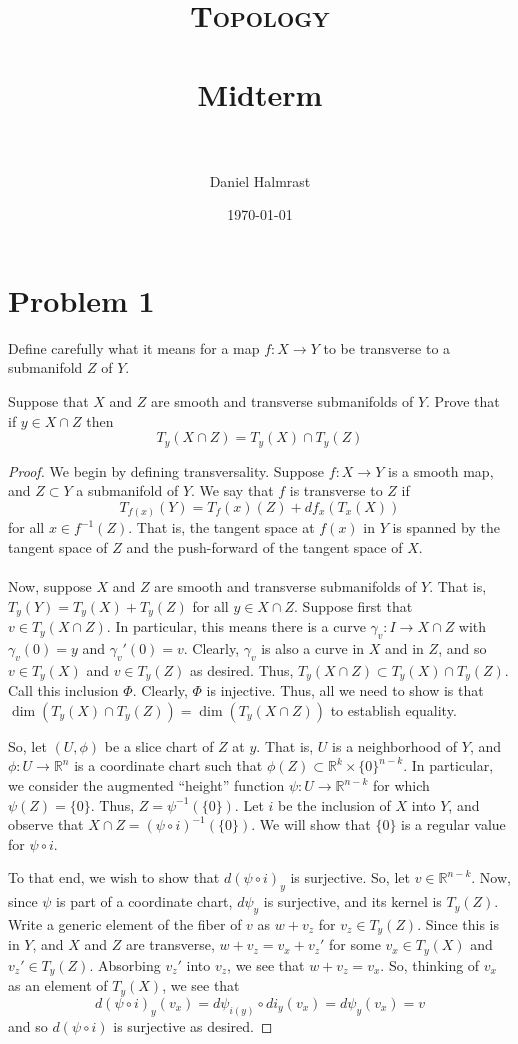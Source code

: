 \documentclass[fontsize=11pt]{scrartcl} %
\title{	
\normalfont \normalsize 
\textsc{Topology} \\ [25pt] %
\horrule{0.5pt} \\[0.4cm] %
\huge Midterm \\ %
\horrule{2pt} \\[0.5cm] %
}
\author{Daniel Halmrast} %
\date{\normalsize\today} %
\numberwithin{equation}{section} %
\numberwithin{figure}{section} %
\numberwithin{table}{section} %
\newcommand{\R}{\mathbb{R}}
\begin{document}
\maketitle %

\section*{Problem 1}
Define carefully what it means for a map $f:X\to Y$ to be transverse to a
submanifold $Z$ of $Y$.

Suppose that $X$ and $Z$ are smooth and transverse submanifolds of $Y$. Prove
that if $y\in X\cap Z$ then
\[
    T_y(X\cap Z) = T_y(X)\cap T_y(Z)
\]

\begin{proof}
    We begin by defining transversality. Suppose $f:X\to Y$ is a smooth map, and
    $Z\subset Y$ a submanifold of $Y$. We say that $f$ is transverse to $Z$ if
    \[
        T_{f(x)}(Y) = T_f(x)(Z) + df_x(T_x(X))
    \]
    for all $x\in f^{-1}(Z)$. That is, the tangent space at $f(x)$ in $Y$ is
    spanned by the tangent space of $Z$ and the push-forward of the tangent
    space of $X$.
    \\
    \\
    Now, suppose $X$ and $Z$ are smooth and transverse submanifolds of $Y$. That
    is, $T_y(Y) = T_y(X)+T_y(Z)$ for all $y\in X\cap Z$. Suppose first that
    $v\in T_y(X\cap Z)$. In particular, this means there is a curve
    $\gamma_v:I\to X\cap Z$ with $\gamma_v(0)=y$ and $\gamma_v'(0)=v$. Clearly,
    $\gamma_v$ is also a curve in $X$ and in $Z$, and so $v\in T_y(X)$ and $v\in
    T_y(Z)$ as desired. Thus, $T_y(X\cap Z)\subset T_y(X)\cap T_y(Z)$. Call this
    inclusion $\Phi$. Clearly, $\Phi$ is injective. Thus, all we need to show is
    that $\dim(T_y(X)\cap T_y(Z)) = \dim(T_y(X\cap Z))$ to establish equality.

    So, let $(U,\phi)$ be a slice chart of $Z$ at $y$. That is, $U$ is a
    neighborhood of $Y$, and $\phi:U\to\R^n$ is a coordinate chart such that
    $\phi(Z)\subset \R^k\times \{0\}^{n-k}$. In particular, we consider the
    augmented ``height'' function $\psi:U\to \R^{n-k}$ for which $\psi(Z) =
    \{0\}$. Thus, $Z=\psi^{-1}(\{0\})$. Let $i$ be the inclusion of $X$ into
    $Y$, and observe that $X\cap Z = (\psi\circ i)^{-1}(\{0\})$. We will show
    that $\{0\}$ is a regular value for $\psi\circ i$.

    To that end, we wish to show that $d(\psi\circ i)_y$ is surjective. So, let
    $v\in\R^{n-k}$. Now, since $\psi$ is part of a coordinate chart, $d\psi_y$ is
    surjective, and its kernel is $T_y(Z)$. Write a generic element of the fiber
    of $v$ as $w + v_z$ for $v_z\in T_y(Z)$. Since this is in $Y$, and $X$ and
    $Z$ are transverse, $w+v_z = v_x+v_z'$ for some $v_x\in T_y(X)$ and $v_z'\in
    T_y(Z)$. Absorbing $v_z'$ into $v_z$, we see that $w+v_z = v_x$. So,
    thinking of $v_x$ as an element of $T_y(X)$, we see that
    \[
        d(\psi\circ i)_y(v_x) = d\psi_{i(y)}\circ di_y(v_x) = d\psi_y(v_x) = v
    \]
    and so $d(\psi\circ i)$ is surjective as desired.


\end{proof}
\end{document}
